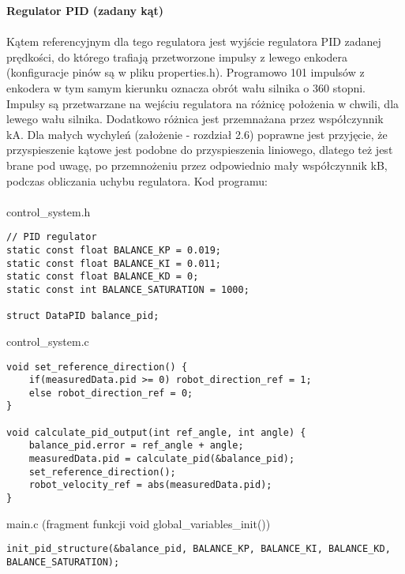 \documentclass[a4paper,12pt,twoside,openany]{report}
\begin{document}
\noindent\textbf{Regulator PID (zadany kąt)}\\
\\
Kątem referencyjnym dla tego regulatora jest wyjście regulatora PID zadanej prędkości, do którego trafiają przetworzone impulsy z lewego enkodera (konfiguracje pinów są w pliku properties.h). Programowo 101 impulsów z enkodera w tym samym kierunku oznacza obrót wału silnika o 360 stopni. Impulsy są przetwarzane na wejściu regulatora na różnicę położenia w chwili, dla lewego wału silnika. Dodatkowo różnica jest przemnażana przez współczynnik kA. Dla małych wychyleń (założenie - rozdział 2.6) poprawne jest przyjęcie, że przyspieszenie kątowe jest podobne do przyspieszenia liniowego, dlatego też jest brane pod uwagę, po przemnożeniu przez odpowiednio mały współczynnik kB, podczas obliczania uchybu regulatora. Kod programu:\\
\\
\noindent control\_system.h
\begin{lstlisting}[style=customc]
// PID regulator
static const float BALANCE_KP = 0.019;
static const float BALANCE_KI = 0.011;
static const float BALANCE_KD = 0;
static const int BALANCE_SATURATION = 1000;

struct DataPID balance_pid;
\end{lstlisting}
control\_system.c
\begin{lstlisting}[style=customc]
void set_reference_direction() {
	if(measuredData.pid >= 0) robot_direction_ref = 1;
	else robot_direction_ref = 0;
}

void calculate_pid_output(int ref_angle, int angle) {
	balance_pid.error = ref_angle + angle;
	measuredData.pid = calculate_pid(&balance_pid);
	set_reference_direction();
	robot_velocity_ref = abs(measuredData.pid);
}
\end{lstlisting}
main.c (fragment funkcji void global\_variables\_init())
\begin{lstlisting}[style=customc]
init_pid_structure(&balance_pid, BALANCE_KP, BALANCE_KI, BALANCE_KD, BALANCE_SATURATION);
\end{lstlisting}
\end{document}
